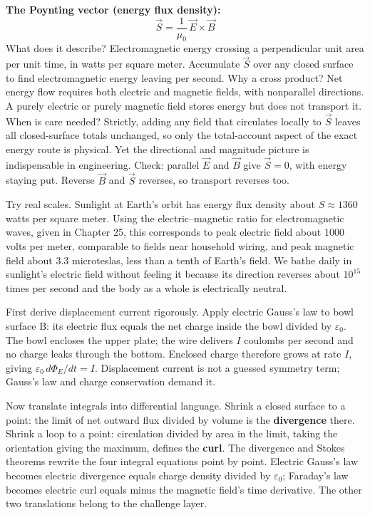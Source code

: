 \textbf{The Poynting vector (energy flux density):}
\[
\vec S=\frac{1}{\mu_0}\,\vec E\times\vec B
\]
What does it describe? Electromagnetic energy crossing a perpendicular unit area per unit time, in watts per square meter. Accumulate \(\vec S\) over any closed surface to find electromagnetic energy leaving per second. Why a cross product? Net energy flow requires both electric and magnetic fields, with nonparallel directions. A purely electric or purely magnetic field stores energy but does not transport it. When is care needed? Strictly, adding any field that circulates locally to \(\vec S\) leaves all closed-surface totals unchanged, so only the total-account aspect of the exact energy route is physical. Yet the directional and magnitude picture is indispensable in engineering. Check: parallel \(\vec E\) and \(\vec B\) give \(\vec S=0\), with energy staying put. Reverse \(\vec B\) and \(\vec S\) reverses, so transport reverses too.

Try real scales. Sunlight at Earth's orbit has energy flux density about \(S\approx1360\) watts per square meter. Using the electric--magnetic ratio for electromagnetic waves, given in Chapter 25, this corresponds to peak electric field about \(1000\) volts per meter, comparable to fields near household wiring, and peak magnetic field about \(3.3\) microteslas, less than a tenth of Earth's field. We bathe daily in sunlight's electric field without feeling it because its direction reverses about \(10^{15}\) times per second and the body as a whole is electrically neutral.

\begin{mathbridge}
First derive displacement current rigorously. Apply electric Gauss's law to bowl surface B: its electric flux equals the net charge inside the bowl divided by \(\varepsilon_0\). The bowl encloses the upper plate; the wire delivers \(I\) coulombs per second and no charge leaks through the bottom. Enclosed charge therefore grows at rate \(I\), giving \(\varepsilon_0\,d\varPhi_E/dt=I\). Displacement current is not a guessed symmetry term; Gauss's law and charge conservation demand it.

Now translate integrals into differential language. Shrink a closed surface to a point: the limit of net outward flux divided by volume is the \textbf{divergence} there. Shrink a loop to a point: circulation divided by area in the limit, taking the orientation giving the maximum, defines the \textbf{curl}. The divergence and Stokes theorems rewrite the four integral equations point by point. Electric Gauss's law becomes electric divergence equals charge density divided by \(\varepsilon_0\); Faraday's law becomes electric curl equals minus the magnetic field's time derivative. The other two translations belong to the challenge layer.
\end{mathbridge}

